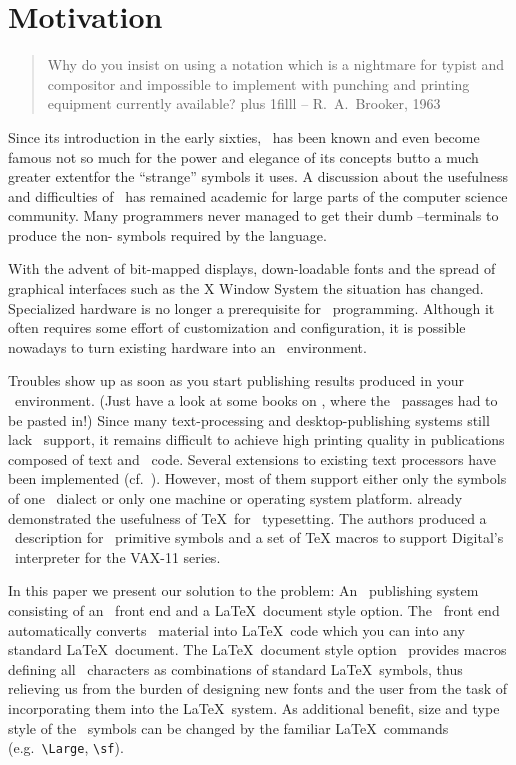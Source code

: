 \section{Motivation}
 
\begin{quotation}
Why do you insist on using a notation which is a nightmare for typist
and compositor and impossible to implement with punching and printing
equipment currently available?  \hfill\break
\hbox{}\hskip0pt plus 1filll
-- R.~A.~Brooker, 1963 \cite{Iverson}
\end{quotation}
 
Since its introduction in the early sixties, \APL\ has been known and
even become famous not so much for the power and elegance of its
concepts but\Dash to a much greater extent\Dash for the
``strange'' symbols it uses.  A discussion about the
usefulness and difficulties of \APL\ has remained academic for large
parts of the computer science community.  Many programmers never
managed to get their dumb \ASCII{}--terminals to produce
the non-\ASCII{} symbols required by the language.
 
With the advent of bit-mapped displays, down-loadable fonts and the
spread of graphical interfaces such as the X Window System the
situation has changed. Specialized hardware is no longer a
prerequisite for \APL\ programming. Although it often requires some
effort of customization and configuration, it is possible nowadays to
turn existing hardware into an \APL\ environment.
 
Troubles show up as soon as you start publishing results produced in
your \APL\ environment.  (Just have a look at some books on \APL,
where the \APL\ passages had to be pasted in!) Since many
text-processing and desktop-publishing systems still lack \APL\
support, it remains difficult to achieve high printing quality in
publications composed of text and \APL\ code.  Several extensions to
existing text processors have been implemented (cf.\ \cite{Hohti}).
However, most of them support either only the symbols of one \APL\
dialect or only one machine or operating system platform.
\cite{Hohti} already demonstrated the usefulness of \TeX\ for \APL\
typesetting. The authors produced a \MF\ description for
\APL\ primitive symbols and a set of \TeX{} macros to support
Digital's \APL\ interpreter for the VAX-11 series.
 
In this paper we present our solution to the problem:  An \APL\
publishing system consisting of an \APL\ front end and a
\LaTeX\ document style option.  The  \APL\ front end
automatically converts \APL\ material into \LaTeX\ code  which you
can \verb++ into any standard \LaTeX\ document. The \LaTeX\
document style option \apl\ provides macros defining all
\APL\ characters as combinations of standard \LaTeX\ symbols, thus
relieving us from the burden of designing new fonts and the user from
the task of incorporating them into the \LaTeX\ system.
\TUBedit{11}As additional benefit, size and type style of the \APL\
symbols can be changed by the familiar \LaTeX\ commands
(\TUBedit{12}e.g.\ \verb+\Large+, \verb+\sf+).
 
